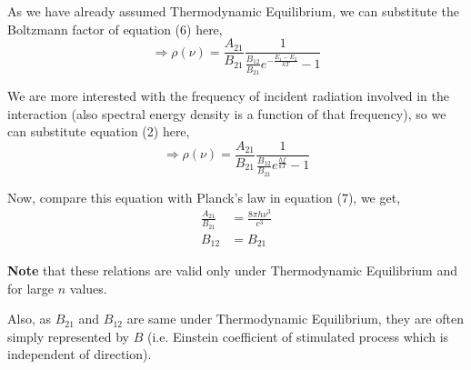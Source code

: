 \documentclass[12pt]{article}
\begin{document}
As we have already assumed Thermodynamic Equilibrium, we can substitute the Boltzmann factor of equation (6) here,
\begin{equation*}
    \Rightarrow \rho(\nu) = \frac{A_{21}}{B_{21}} \frac{1}{\frac{B_{12}}{B_{21}} e^{-\frac{E_{1} - E_{2}}{kT}} - 1}
\end{equation*} \vspace{.2cm}

We are more interested with the frequency of incident radiation involved in the interaction (also spectral energy density is a function of that frequency), so we can substitute equation (2) here,
\begin{equation}
    \Rightarrow \rho(\nu) = \frac{A_{21}}{B_{21}} \frac{1}{\frac{B_{12}}{B_{21}} e^{\frac{hf}{kT}} - 1}
\end{equation}

Now, compare this equation with Planck's law in equation (7), we get,
\begin{align}
    \frac{A_{21}}{B_{21}} & = \frac{8\pi h \nu^3}{c^3} \\
    B_{12} & = B_{21}
\end{align}

\textbf{Note} that these relations are valid only under Thermodynamic Equilibrium and for large $n$ values.

Also, as $B_{21}$ and $B_{12}$ are same under Thermodynamic Equilibrium, they are often simply represented by $B$ (i.e. Einstein coefficient of stimulated process which is independent of direction).
\end{document}
